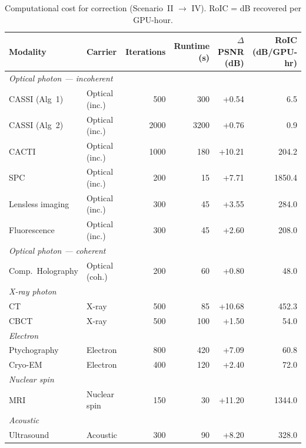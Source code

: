 \documentclass[11pt]{article}
\begin{document}
\begin{table}[htbp]
\centering
\caption{Computational cost for correction (Scenario~II $\to$ IV).
RoIC = dB recovered per GPU-hour.}
\label{tab:cost}
\begin{tabular}{l l r r r r}
\toprule
\textbf{Modality} & \textbf{Carrier} & \textbf{Iterations} & \textbf{Runtime (s)} &
  \textbf{$\Delta$PSNR (dB)} & \textbf{RoIC (dB/GPU-hr)} \\
\midrule
\multicolumn{6}{l}{\textit{Optical photon — incoherent}} \\
CASSI (Alg~1)    & Optical (inc.)  &   500 &    300 &  +0.54 &    6.5 \\
CASSI (Alg~2)    & Optical (inc.)  &  2000 &   3200 &  +0.76 &    0.9 \\
CACTI            & Optical (inc.)  &  1000 &    180 & +10.21 &  204.2 \\
SPC              & Optical (inc.)  &   200 &     15 &  +7.71 & 1850.4 \\
Lensless imaging & Optical (inc.)  &   300 &     45 &  +3.55 &  284.0 \\
Fluorescence     & Optical (inc.)  &   300 &     45 &  +2.60 &  208.0 \\
\multicolumn{6}{l}{\textit{Optical photon — coherent}} \\
Comp.\ Holography & Optical (coh.) &   200 &     60 &  +0.80 &   48.0 \\
\multicolumn{6}{l}{\textit{X-ray photon}} \\
CT               & X-ray           &   500 &     85 & +10.68 &  452.3 \\
CBCT             & X-ray           &   500 &    100 &  +1.50 &   54.0 \\
\multicolumn{6}{l}{\textit{Electron}} \\
Ptychography     & Electron        &   800 &    420 &  +7.09 &   60.8 \\
Cryo-EM          & Electron        &   400 &    120 &  +2.40 &   72.0 \\
\multicolumn{6}{l}{\textit{Nuclear spin}} \\
MRI              & Nuclear spin    &   150 &     30 & +11.20 & 1344.0 \\
\multicolumn{6}{l}{\textit{Acoustic}} \\
Ultrasound       & Acoustic        &   300 &     90 &  +8.20 &  328.0 \\
\bottomrule
\end{tabular}
\end{table}
\end{document}
